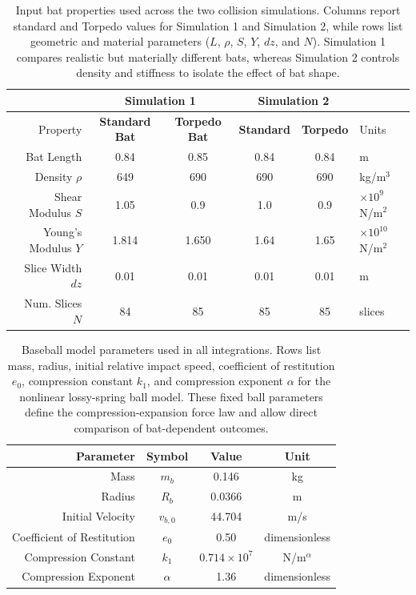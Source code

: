 \documentclass[linenumbers]{aastex7}
\begin{document}
\begin{table}[h!]
    \centering
    \begin{tabular}{|r|c|c|c|c|l|}
        \hline
        \multicolumn{1}{|c|}{} & \multicolumn{2}{c|}{\textbf{Simulation 1}} & \multicolumn{2}{c|}{\textbf{Simulation 2}} & \multicolumn{1}{c|}{} \\
        \hline
        Property& \textbf{Standard Bat} & \textbf{Torpedo Bat} & \textbf{Standard}& \textbf{Torpedo} & Units\\
        \hline
        Bat Length & 0.84 & 0.85 & 0.84& 0.84& m \\
        Density $\rho$ & 649 & 690 & 690&690& kg/m$^3$\\
        Shear Modulus $S$ & 1.05 & 0.9 & 1.0&0.9& $\times 10^{9}$ N/m$^2$ \\ 
        Young's Modulus $Y$ & 1.814 & 1.650 &1.64&1.65& $\times 10^{10}$ N/m$^2$\\ 
        \hline \hline
        Slice Width $dz$ & 0.01 & 0.01 &0.01&0.01& m\\
        Num. Slices $N$ & 84 & 85 &85&85& slices\\
        \hline
    \end{tabular}
    \caption{Input bat properties used across the two collision simulations. Columns report standard and Torpedo values for Simulation 1 and Simulation 2, while rows list geometric and material parameters ($L$, $\rho$, $S$, $Y$, $dz$, and $N$). Simulation 1 compares realistic but materially different bats, whereas Simulation 2 controls density and stiffness to isolate the effect of bat shape.}
    \label{tab:batprops}
\end{table}


\begin{table}[h]
    \centering
    \begin{tabular}{|r|ccc|}
        \hline 
        \textbf{Parameter} & \textbf{Symbol} & \textbf{Value} & \textbf{Unit} \\
        \hline
        Mass & $m_b$ & 0.146 & kg \\
        Radius & $R_b$ & 0.0366 & m \\
        Initial Velocity & $v_{b,0}$ & 44.704 & m/s \\
        Coefficient of Restitution & $e_0$ & 0.50 & dimensionless \\
        Compression Constant & $k_1$ & $0.714\times 10^{7}$ & N/m$^{\alpha}$ \\
        Compression Exponent & $\alpha$ & 1.36 & dimensionless \\
        \hline
    \end{tabular}
    \caption{Baseball model parameters used in all integrations. Rows list mass, radius, initial relative impact speed, coefficient of restitution $e_0$, compression constant $k_1$, and compression exponent $\alpha$ for the nonlinear lossy-spring ball model. These fixed ball parameters define the compression-expansion force law and allow direct comparison of bat-dependent outcomes.}
    \label{tab:ball}
\end{table}




\begin{acknowledgments}

\end{acknowledgments}

{}

\end{document}
